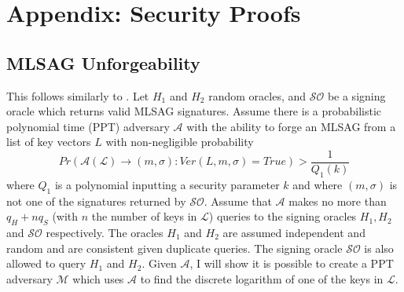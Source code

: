 \documentclass[12pt,oneside,english]{amsart}
\numberwithin{equation}{section}
\numberwithin{figure}{section}
\theoremstyle{plain}
\theoremstyle{plain}
\theoremstyle{remark}
\theoremstyle{plain}
\theoremstyle{remark}
\theoremstyle{remark}
\theoremstyle{plain}
\theoremstyle{definition}
\begin{document}



\appendix

\section{Appendix: Security Proofs}

\subsection{MLSAG Unforgeability}

This follows similarly to \cite[Theorem 1]{LWW}. Let $H_{1}$ and
$H_{2}$ random oracles, and $\mathcal{SO}$ be a signing oracle which
returns valid MLSAG signatures. Assume there is a probabilistic polynomial
time (PPT) adversary $\mathcal{A}$ with the ability to forge an MLSAG
from a list of key vectors $L$ with non-negligible probability 
\[
Pr\left(\mathcal{A}\left(\mathcal{L}\right)\to\left(m,\sigma\right):Ver\left(L,m,\sigma\right)=True\right)>\frac{1}{Q_{1}\left(k\right)}
\]
 where $Q_{1}$ is a polynomial inputting a security parameter $k$
and where $\left(m,\sigma\right)$ is not one of the signatures returned
by $\mathcal{S}\mathcal{O}$. Assume that $\mathcal{A}$ makes no
more than $q_{H}+nq_{S}$ (with $n$ the number of keys in $\mathcal{L}$)
queries to the signing oracles $H_{1},H_{2}$ and $\mathcal{SO}$
respectively. The oracles $H_{1}$ and $H_{2}$ are assumed independent
and random and are consistent given duplicate queries. The signing
oracle $\mathcal{SO}$ is also allowed to query $H_{1}$ and $H_{2}$.
Given $\mathcal{A}$, I will show it is possible to create a PPT adversary
$\mathcal{M}$ which uses $\mathcal{A}$ to find the discrete logarithm
of one of the keys in $\mathcal{L}$. 
\end{document}
